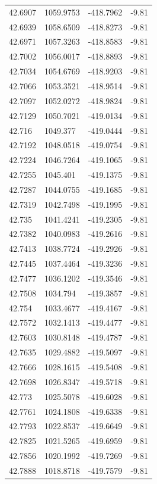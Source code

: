 \begin{table}[H]
\begin{tabular}{llll}
42.6907 & 1059.9753 & -418.7962 & -9.81 \\
42.6939 & 1058.6509 & -418.8273 & -9.81 \\
42.6971 & 1057.3263 & -418.8583 & -9.81 \\
42.7002 & 1056.0017 & -418.8893 & -9.81 \\
42.7034 & 1054.6769 & -418.9203 & -9.81 \\
42.7066 & 1053.3521 & -418.9514 & -9.81 \\
42.7097 & 1052.0272 & -418.9824 & -9.81 \\
42.7129 & 1050.7021 & -419.0134 & -9.81 \\
42.716 & 1049.377 & -419.0444 & -9.81 \\
42.7192 & 1048.0518 & -419.0754 & -9.81 \\
42.7224 & 1046.7264 & -419.1065 & -9.81 \\
42.7255 & 1045.401 & -419.1375 & -9.81 \\
42.7287 & 1044.0755 & -419.1685 & -9.81 \\
42.7319 & 1042.7498 & -419.1995 & -9.81 \\
42.735 & 1041.4241 & -419.2305 & -9.81 \\
42.7382 & 1040.0983 & -419.2616 & -9.81 \\
42.7413 & 1038.7724 & -419.2926 & -9.81 \\
42.7445 & 1037.4464 & -419.3236 & -9.81 \\
42.7477 & 1036.1202 & -419.3546 & -9.81 \\
42.7508 & 1034.794 & -419.3857 & -9.81 \\
42.754 & 1033.4677 & -419.4167 & -9.81 \\
42.7572 & 1032.1413 & -419.4477 & -9.81 \\
42.7603 & 1030.8148 & -419.4787 & -9.81 \\
42.7635 & 1029.4882 & -419.5097 & -9.81 \\
42.7666 & 1028.1615 & -419.5408 & -9.81 \\
42.7698 & 1026.8347 & -419.5718 & -9.81 \\
42.773 & 1025.5078 & -419.6028 & -9.81 \\
42.7761 & 1024.1808 & -419.6338 & -9.81 \\
42.7793 & 1022.8537 & -419.6649 & -9.81 \\
42.7825 & 1021.5265 & -419.6959 & -9.81 \\
42.7856 & 1020.1992 & -419.7269 & -9.81 \\
42.7888 & 1018.8718 & -419.7579 & -9.81 \\

\end{tabular}
\end{table}
